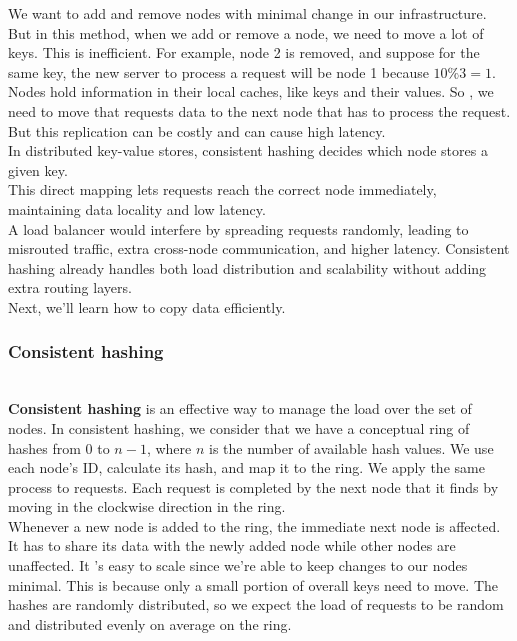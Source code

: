 We want to add and remove nodes with minimal change in our infrastructure. But in this method, when we add or remove a node, we need to move a lot of keys. This is inefficient. For example, node 2 is removed, and suppose for the same key, the new server to process a request will be node 1 because \protect{}\label{katex_inline_OQJLFBZKFeO36tLD-ynX0}{{{\(10 \% 3 = 1\)}}}. Nodes hold information in their local caches, like keys and their values. So , we need to move that request\textquotesingle s data to the next node that has to process the request. But this replication can be costly and can cause high latency.
\\
In distributed key-value stores, consistent hashing decides which node stores a given key.
\\
This direct mapping lets requests reach the correct node immediately, maintaining data locality and low latency.
\\
A load balancer would interfere by spreading requests randomly, leading to misrouted traffic, extra cross-node communication, and higher latency. Consistent hashing already handles both load distribution and scalability without adding extra routing layers.
\\
Next, we'll learn how to copy data efficiently.

\subsubsection{Consistent hashing}\label{LZreKB57_LZpnGlpn_gHK}
\\
\textbf{Consistent hashing} is an effective way to manage the load over the set of nodes. In consistent hashing, we consider that we have a conceptual ring of hashes from \protect{}\label{katex_inline_8n_kkpRM6pVDyL-n8ipjT}{{{\(0\)}}} to \protect{}\label{katex_inline_26BXtV7CUn0TBWskhoO6E}{{{\(n-1\)}}}, where \protect{}\label{katex_inline_ysWHEH_MvDL5T_hCW6gCy}{{{\(n\)}}} is the number of available hash values. We use each node's ID, calculate its hash, and map it to the ring. We apply the same process to requests. Each request is completed by the next node that it finds by moving in the clockwise direction in the ring.
\\
Whenever a new node is added to the ring, the immediate next node is affected. It has to share its data with the newly added node while other nodes are unaffected. It 's easy to scale since we're able to keep changes to our nodes minimal. This is because only a small portion of overall keys need to move. The hashes are randomly distributed, so we expect the load of requests to be random and distributed evenly on average on the ring.

